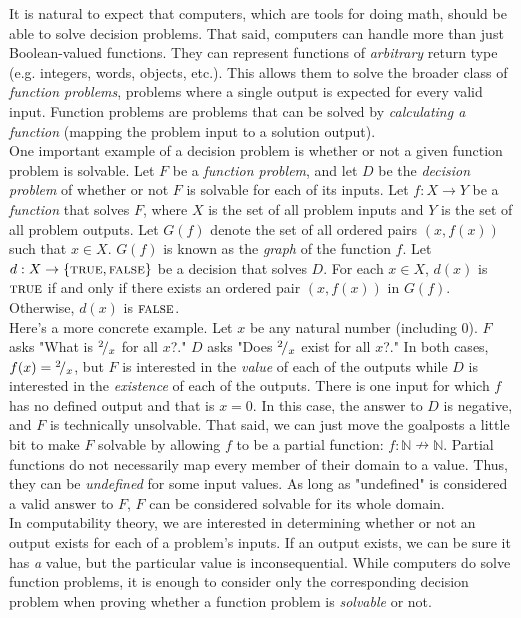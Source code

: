 It is natural to expect that computers, which are tools for doing math, should be able to solve decision problems. That said, computers can handle more than just Boolean-valued functions. They can represent functions of \textit{arbitrary} return type (e.g. integers, words, objects, etc.). This allows them to solve the broader class of \textit{function problems}, problems where a single output is expected for every valid input. Function problems are problems that can be solved by \textit{calculating a function} (mapping the problem input to a solution output). \\

One important example of a decision problem is whether or not a given function problem is solvable. Let $F$ be a \textit{function problem}, and let $D$ be the \textit{decision problem} of whether or not $F$ is solvable for each of its inputs. Let $f:X\rightarrow Y$ be a \textit{function} that solves $F$, where $X$ is the set of all problem inputs and $Y$ is the set of all problem outputs. Let $G(f)$ denote the set of all ordered pairs $(x,f(x))$ such that $x\in X$. $G(f)$ is known as the \textit{graph} of the function $f$. Let $d:X\rightarrow \{\textsc{true},\textsc{false}\}$ be a decision that solves $D$. For each $x\in X$, $d(x)$ is $\textsc{true}$ if and only if there exists an ordered pair $(x,f(x))$ in $G(f)$. Otherwise, $d(x)$ is $\textsc{false}$. \\

Here's a more concrete example. Let $x$ be any natural number (including 0). $F$ asks "What is ${}^{2}\!/_{x}$ for all $x$?." $D$ asks "Does ${}^{2}\!/_{x}$ exist for all $x$?." In both cases, $f(x)={}^{2}\!/_{x}$, but $F$ is interested in the \textit{value} of each of the outputs while $D$ is interested in the \textit{existence} of each of the outputs. There is one input for which $f$ has no defined output and that is $x=0$. In this case, the answer to $D$ is negative, and $F$ is technically unsolvable. That said, we can just move the goalposts a little bit to make $F$ solvable by allowing $f$ to be a partial function: $f:\mathbb{N}\nrightarrow \mathbb{N}$. Partial functions do not necessarily map every member of their domain to a value. Thus, they can be \textit{undefined} for some input values. As long as "undefined" is considered a valid answer to $F$, $F$ can be considered solvable for its whole domain. \\

In computability theory, we are interested in determining whether or not an output exists for each of a problem's inputs. If an output exists, we can be sure it has \textit{a} value, but the particular value is inconsequential. While computers do solve function problems, it is enough to consider only the corresponding decision problem when proving whether a function problem is \textit{solvable} or not. \\

